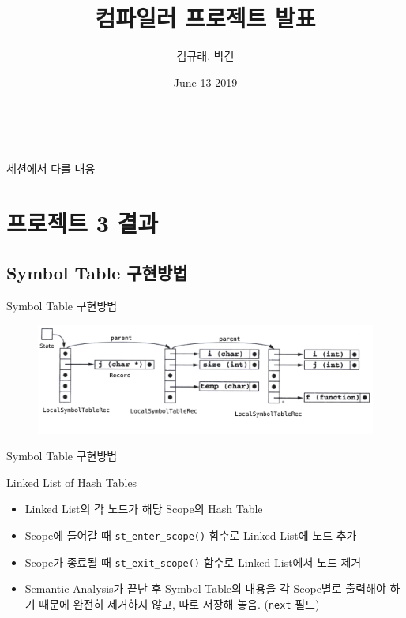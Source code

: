 \documentclass{bredelebeamer}
\title[Compiler Project Presentation]{컴파일러 프로젝트 발표}
\subtitle{}
\author{김규래, 박건}
\institute[Sogang University]
{
  서강대학교\\
}
\date{June 13 2019}
\def\code#1{\texttt{#1}}
\begin{document}
\begin{frame}
  \titlepage\
\end{frame}

\begin{frame}{세션에서 다룰 내용}
  \tableofcontents %
\end{frame}

\section{프로젝트 3 결과}
\subsection{Symbol Table 구현방법}
\begin{frame}{Symbol Table 구현방법}
	\begin{figure}
		\includegraphics[scale=0.3]{images/symtab.png}
	\end{figure}
\end{frame}

\begin{frame}{Symbol Table 구현방법}
	\begin{block}{Linked List of Hash Tables}
		\begin{itemize}
			\item Linked List의 각 노드가 해당 Scope의 Hash Table
			\item Scope에 들어갈 때 \code{st\_enter\_scope()} 함수로 Linked List에 노드 추가
			\item Scope가 종료될 때 \code{st\_exit\_scope()} 함수로 Linked List에서 노드 제거
			\item Semantic Analysis가 끝난 후 Symbol Table의 내용을 각 Scope별로 출력해야 하기 때문에 완전히 제거하지 않고, 따로 저장해 놓음. (\code{next} 필드)
		\end{itemize}
	\end{block}
\end{frame}
\end{document}
